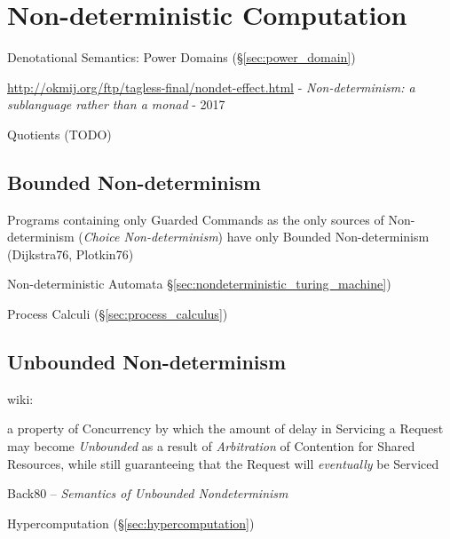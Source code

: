 \section{Non-deterministic Computation}
\label{sec:nondeterministic_computation}

Denotational Semantics: Power Domains (\S\ref{sec:power_domain})

\url{http://okmij.org/ftp/tagless-final/nondet-effect.html} -
\emph{Non-determinism: a sublanguage rather than a monad} - 2017

Quotients (TODO)



\subsection{Bounded Non-determinism}\label{sec:bounded_nondeterminism}

Programs containing only Guarded Commands as the only sources of
Non-determinism (\emph{Choice Non-determinism}) have only Bounded
Non-determinism (Dijkstra76, Plotkin76)

\fist Non-deterministic Automata
\S\ref{sec:nondeterministic_turing_machine})

\fist Process Calculi (\S\ref{sec:process_calculus})



\subsection{Unbounded Non-determinism}
\label{sec:unbounded_nondeterminism}

wiki:

a property of Concurrency by which the amount of delay in Servicing a
Request may become \emph{Unbounded} as a result of \emph{Arbitration}
of Contention for Shared Resources, while still guaranteeing that the
Request will \emph{eventually} be Serviced

Back80 -- \emph{Semantics of Unbounded Nondeterminism}

\fist Hypercomputation (\S\ref{sec:hypercomputation})

